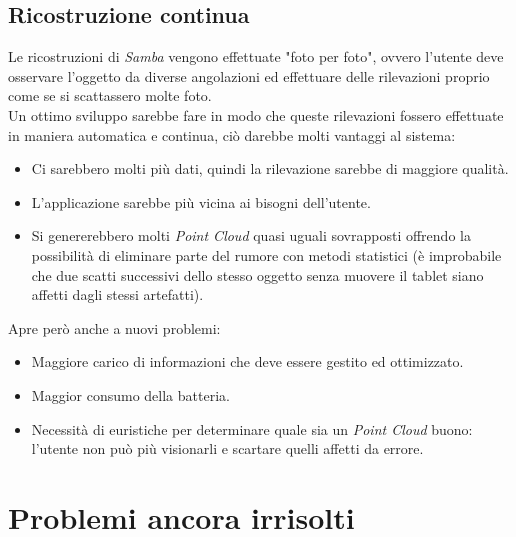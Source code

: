 \subsection{Ricostruzione continua}
Le ricostruzioni di \emph{Samba} vengono effettuate "foto per foto", ovvero l'utente deve osservare l'oggetto da diverse angolazioni ed effettuare delle rilevazioni proprio come se si scattassero molte foto.\\
Un ottimo sviluppo sarebbe fare in modo che queste rilevazioni fossero effettuate in maniera automatica e continua, ciò darebbe molti vantaggi al sistema:
\begin{itemize}
	\item Ci sarebbero molti più dati, quindi la rilevazione sarebbe di maggiore qualità.
	\item L'applicazione sarebbe più vicina ai bisogni dell'utente.
	\item Si genererebbero molti \emph{Point Cloud} quasi uguali sovrapposti offrendo la possibilità di eliminare parte del rumore con metodi statistici (è improbabile che due scatti successivi dello stesso oggetto senza muovere il tablet siano affetti dagli stessi artefatti).
\end{itemize}
Apre però anche a nuovi problemi:
\begin{itemize}
	\item Maggiore carico di informazioni che deve essere gestito ed ottimizzato.
	\item Maggior consumo della batteria.
	\item Necessità di euristiche per determinare quale sia un \emph{Point Cloud} buono: l'utente non può più visionarli e scartare quelli affetti da errore.
\end{itemize}


\section{Problemi ancora irrisolti}

